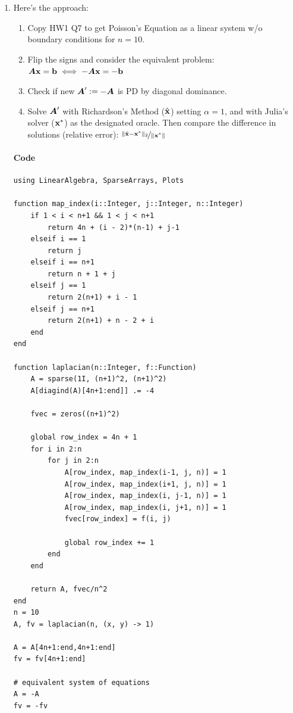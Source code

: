 \documentclass[]{exam}
\let\oldparagraph\paragraph
\renewcommand{\paragraph}[1]{\oldparagraph{#1}\mbox{}}
\begin{document}
\begin{questions}

\question
\hfill

\begin{enumerate}[label=\arabic*.]
	\item Here's the approach:
		\begin{enumerate}[label=\alph*.]
			\item Copy HW1 Q7 to get Poisson's Equation as a linear system w/o boundary conditions for $n = 10$.
			\item Flip the signs and consider the equivalent problem: $\boldsymbol{A} \boldsymbol{\mathrm{x}} = \boldsymbol{\mathrm{b}} \iff -\boldsymbol{A} \boldsymbol{\mathrm{x}} = -\boldsymbol{\mathrm{b}}$
			\item Check if new $\boldsymbol{A}' := -\boldsymbol{A}$ is PD by diagonal dominance.
			\item Solve $\boldsymbol{A}'$ with Richardson's Method ($\hat{\boldsymbol{\mathrm{x}}}$) setting $\alpha = 1$, and with Julia's solver ($\boldsymbol{\mathrm{x}}^*$) as the designated oracle. Then compare the difference in solutions (relative error): $\nicefrac{\|\hat{\boldsymbol{\mathrm{x}}} - \boldsymbol{\mathrm{x}}^* \|_2}{\| \boldsymbol{\mathrm{x}}^* \|}$
		\end{enumerate}

		\paragraph{Code}
			\begin{lstlisting}
using LinearAlgebra, SparseArrays, Plots

function map_index(i::Integer, j::Integer, n::Integer)
	if 1 < i < n+1 && 1 < j < n+1
		return 4n + (i - 2)*(n-1) + j-1
	elseif i == 1
		return j
	elseif i == n+1
		return n + 1 + j
	elseif j == 1
		return 2(n+1) + i - 1
	elseif j == n+1
		return 2(n+1) + n - 2 + i
	end
end

function laplacian(n::Integer, f::Function)
	A = sparse(1I, (n+1)^2, (n+1)^2)
	A[diagind(A)[4n+1:end]] .= -4

	fvec = zeros((n+1)^2)

	global row_index = 4n + 1
	for i in 2:n
		for j in 2:n
			A[row_index, map_index(i-1, j, n)] = 1
			A[row_index, map_index(i+1, j, n)] = 1
			A[row_index, map_index(i, j-1, n)] = 1
			A[row_index, map_index(i, j+1, n)] = 1
			fvec[row_index] = f(i, j)

			global row_index += 1
		end
	end

	return A, fvec/n^2
end
n = 10
A, fv = laplacian(n, (x, y) -> 1)

A = A[4n+1:end,4n+1:end]
fv = fv[4n+1:end]

# equivalent system of equations
A = -A
fv = -fv


\end{lstlisting}
\end{enumerate}
\end{questions}
\end{document}
